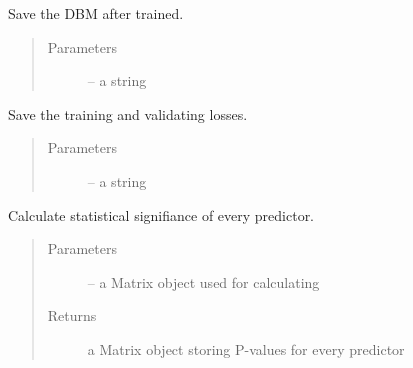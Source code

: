 \documentclass[letterpaper,10pt,english]{sphinxmanual}
\begin{document}
\begin{fulllineitems}
\begin{fulllineitems}
\label{\detokenize{index:dbm_py.interface.DBM.save}}
Save the DBM after trained.
\begin{quote}\begin{description}
\item[{Parameters}] \leavevmode
{} -- a string

\end{description}\end{quote}

\end{fulllineitems}


\begin{fulllineitems}
\label{\detokenize{index:dbm_py.interface.DBM.save_performance}}
Save the training and validating losses.
\begin{quote}\begin{description}
\item[{Parameters}] \leavevmode
{} -- a string

\end{description}\end{quote}

\end{fulllineitems}


\begin{fulllineitems}
\label{\detokenize{index:dbm_py.interface.DBM.ss}}
Calculate statistical signifiance of every predictor.
\begin{quote}\begin{description}
\item[{Parameters}] \leavevmode
{} -- a Matrix object used for calculating

\item[{Returns}] \leavevmode
a Matrix object storing P-values for every predictor

\end{description}\end{quote}

\end{fulllineitems}


\end{fulllineitems}
\end{document}
